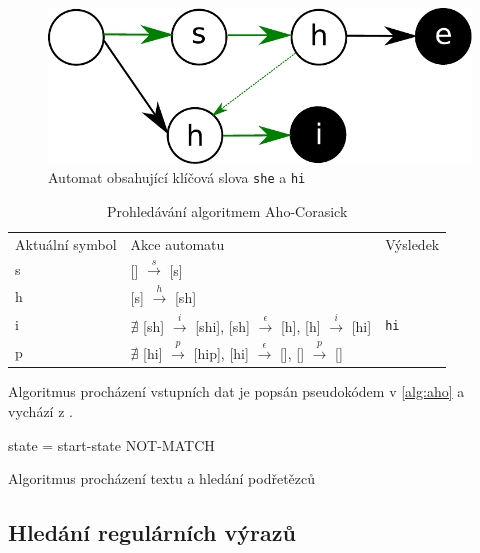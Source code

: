 \begin{figure}[!htbp]
    \centering
    \includegraphics[scale=.55]{fig/ac.pdf}
    \caption{Automat obsahující klíčová slova \texttt{she} a \texttt{hi}}
    \label{fig:ac}
\end{figure}

\begin{table}[!htbp]
	\center
    \begin{tabular}{|l|l|l|}
    \hline
    Aktuální symbol & Akce automatu & Výsledek \\ \hhline{|=|=|=|}
    s & [] $\overset{s}{\rightarrow}$ [s] &  \\ \hline
    h & [s] $\overset{h}{\rightarrow}$ [sh] & \\ \hline
    i & $\nexists$ [sh] $\overset{i}{\rightarrow}$ [shi], [sh] $\overset{\epsilon}{\rightarrow}$ [h], [h] $\overset{i}{\rightarrow}$ [hi] & \texttt{hi} \\ \hline
    p & $\nexists$ [hi] $\overset{p}{\rightarrow}$ [hip], [hi] $\overset{\epsilon}{\rightarrow}$ [], [] $\overset{p}{\rightarrow}$ [] &  \\ \hline
    \end{tabular}
    \caption{Prohledávání algoritmem Aho-Corasick}
	\label{tab:pm-match}
\end{table}


Algoritmus procházení vstupních dat je popsán pseudokódem v \ref{alg:aho} a vychází z \cite{aho}.

\begin{algorithm}[!htbp]
	state = start-state\;
	{
	}
	\Return NOT-MATCH\;
	\caption{Algoritmus procházení textu a hledání podřetězců}
    \label{alg:aho}
\end{algorithm}

\subsection{Hledání regulárních výrazů}\label{sec:regex} %

